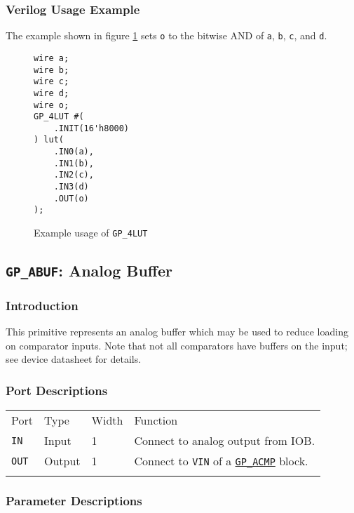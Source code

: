\documentclass[11pt]{article}
\newcommand{\tokenstyle}[1]{\texttt{#1}}
\newcommand{\wirestyle}[1]{\texttt{#1}}
\newcommand{\whenstyle}[1]{{\fontseries{sb}\selectfont#1}}
\newcommand{\tokenref}[2]{\hyperref[#2]{\tokenstyle{#1}}}
\newcommand{\thinhline}{\Xhline{1\arrayrulewidth}}
\newcommand{\thickhline}{\Xhline{2.5\arrayrulewidth}}
\begin{document}
\subsubsection{Verilog Usage Example}

The example shown in figure \ref{gp-4LUT-example} sets \wirestyle{o} to the bitwise AND of \wirestyle{a}, \wirestyle{b}, \wirestyle{c},
and \wirestyle{d}.

\begin{figure}[h]
\begin{lstlisting}
wire a;
wire b;
wire c;
wire d;
wire o;
GP_4LUT #(
	.INIT(16'h8000)
) lut(
	.IN0(a),
	.IN1(b),
	.IN2(c),
	.IN3(d)
	.OUT(o)
);
\end{lstlisting}
\caption{Example usage of \tokenstyle{GP\_4LUT}}
\label{gp-4LUT-example}
\end{figure}


\pagebreak
\subsection{\tokenstyle{GP\_ABUF}: Analog Buffer}
\label{gp-abuf}

\subsubsection{Introduction}
This primitive represents an analog buffer which may be used to reduce loading on comparator inputs. Note that not all
comparators have buffers on the input; see device datasheet for details.

\subsubsection{Port Descriptions}

\begin{tabularx}{\textwidth}{lllX}
\thinhline
\whenstyle{Port} & \whenstyle{Type} & \whenstyle{Width} & \whenstyle{Function} \\
\thickhline
\tokenstyle{IN} & Input & 1 & Connect to analog output from IOB.\\
\thinhline
\tokenstyle{OUT} & Output & 1 & Connect to \tokenstyle{VIN} of a \tokenref{GP\_ACMP}{gp-acmp} block.\\
\thinhline
\end{tabularx}

\subsubsection{Parameter Descriptions}
\end{document}
